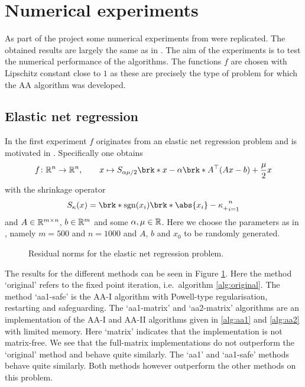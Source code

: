 \section{Numerical experiments}

As part of the project some numerical experiments from \cite{ZhaAA} were replicated. The obtained results are largely the same as in \cite{ZhaAA}. The aim of the experiments is to test the numerical performance of the algorithms. The functions $f$ are chosen with Lipschitz constant close to $1$ as these are precisely the type of problem for which the AA algorithm was developed.

\subsection{Elastic net regression}

In the first experiment $f$ originates from an elastic net regression problem and is motivated in \cite[Section 5.1f]{ZhaAA}. Specifically one obtains
\begin{align*}
	f\colon\R^{n}\to\R^{n}, \qquad x\mapsto S_{\alpha\mu/2}\brk*{x-\alpha\brk*{A^\top(Ax-b)+\frac{\mu}{2}x}}
\end{align*}
with the shrinkage operator
\begin{align*}
	S_\kappa(x) = \brk*{\sgn(x_i)\brk*{\abs{x_i}-\kappa}_+}_{i=1}^{n}
\end{align*}
and $A\in\mathbb{R}^{m\times n}$, $b\in\mathbb{R}^{m}$ and some $\alpha, \mu\in\mathbb{R}$. Here we choose the parameters as in \cite[Section 5.2]{ZhaAA}, namely $m=500$ and $n=1000$ and $A$, $b$ and $x_0$ to be randomly generated.

\begin{figure}
	\centering
	{\scriptsize
	
	}
	\caption{Residual norms for the elastic net regression problem.}
	\label{pl:method_comparison_ISTA}
\end{figure}

The results for the different methods can be seen in Figure \ref{pl:method_comparison_ISTA}. Here the method `original' refers to the fixed point iteration, i.e.\ algorithm \ref{alg:original}. The method `aa1-safe' is the AA-I algorithm with Powell-type regularisation, restarting and safeguarding. The `aa1-matrix' and `aa2-matrix' algorithms are an implementation of the AA-I and AA-II algorithms given in \ref{alg:aa1} and \ref{alg:aa2} with limited memory. Here `matrix' indicates that the implementation is not matrix-free. We see that the full-matrix implementations do not outperform the `original' method and behave quite similarly. The `aa1' and `aa1-safe' methods behave quite similarly. Both methods however outperform the other methods on this problem.


